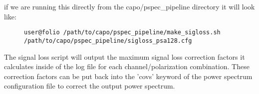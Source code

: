 \documentclass[onecolumn]{emulateapj}
\begin{document}
{if we are running this directly from the capo/pspec\_pipeline directory it will look like:

\begin{figure}[h!]
\begin{lstlisting}[numbers=none]
user@folio /path/to/capo/pspec_pipeline/make_sigloss.sh /path/to/capo/pspec_pipeline/sigloss_psa128.cfg
\end{lstlisting}
\end{figure}

The signal loss script will output the maximum signal loss correction factors it calculates inside of the log file for each channel/polarization combination. These correction factors can be put back into the 'covs' keyword of the power spectrum configuration file to correct the output power spectrum.
}
\end{document}
